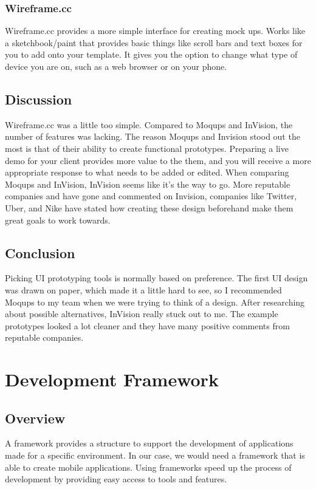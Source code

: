 \documentclass[onecolumn, draftclsnofoot,10pt, compsoc]{IEEEtran}
\begin{document}
\subsubsection{Wireframe.cc}

Wireframe.cc provides a more simple interface for creating mock ups. Works like a sketchbook/paint that provides basic things like scroll bars and text boxes for you to add onto your template. It gives you the option to change what type of device you are on, such as a web browser or on your phone.  

\subsection{Discussion}

Wireframe.cc was a little too simple. Compared to Moqups and InVision, the number of features was lacking. The reason Moqups and Invision stood out the most is that of their ability to create functional prototypes. Preparing a live demo for your client provides more value to the them, and you will receive a more appropriate response to what needs to be added or edited. When comparing Moqups and InVision, InVision seems like it's the way to go. More reputable companies and have gone and commented on Invision, companies like Twitter, Uber, and Nike have stated how creating these design beforehand make them great goals to work towards. 

\subsection{Conclusion}

Picking UI prototyping tools is normally based on preference. The first UI design was drawn on paper, which made it a little hard to see, so I recommended Moqups to my team when we were trying to think of a design. After researching about possible alternatives, InVision really stuck out to me. The example prototypes looked a lot cleaner and they have many positive comments from reputable companies. 

\clearpage
\section{Development Framework}
\subsection{Overview}

A framework provides a structure to support the development of applications made for a specific environment. In our case, we would need a framework that is able to create mobile applications. Using frameworks speed up the process of development by providing easy access to tools and features. 
\end{document}
